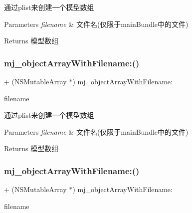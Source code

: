 通过plist来创建一个模型数组 
\begin{DoxyParams}{Parameters}
{\em filename} & 文件名(仅限于main\+Bundle中的文件) \\
\hline
\end{DoxyParams}
\begin{DoxyReturn}{Returns}
模型数组 
\end{DoxyReturn}
\mbox{\label{category_n_s_object_07_m_j_key_value_08_a6e179d7da5def0fe40427b4982a68591}} 
\subsubsection{\texorpdfstring{mj\+\_\+object\+Array\+With\+Filename\+:()}{mj\_objectArrayWithFilename:()}\hspace{0.1cm}{\footnotesize\ttfamily [2/3]}}
{\footnotesize\ttfamily + (N\+S\+Mutable\+Array $\ast$) mj\+\_\+object\+Array\+With\+Filename\+: \begin{DoxyParamCaption}\item[{(N\+S\+String $\ast$)}]{filename }\end{DoxyParamCaption}}

通过plist来创建一个模型数组 
\begin{DoxyParams}{Parameters}
{\em filename} & 文件名(仅限于main\+Bundle中的文件) \\
\hline
\end{DoxyParams}
\begin{DoxyReturn}{Returns}
模型数组 
\end{DoxyReturn}
\mbox{\label{category_n_s_object_07_m_j_key_value_08_a6e179d7da5def0fe40427b4982a68591}} 
\subsubsection{\texorpdfstring{mj\+\_\+object\+Array\+With\+Filename\+:()}{mj\_objectArrayWithFilename:()}\hspace{0.1cm}{\footnotesize\ttfamily [3/3]}}
{\footnotesize\ttfamily + (N\+S\+Mutable\+Array $\ast$) mj\+\_\+object\+Array\+With\+Filename\+: \begin{DoxyParamCaption}\item[{(N\+S\+String $\ast$)}]{filename }\end{DoxyParamCaption}}

